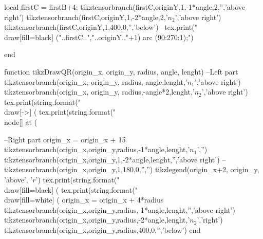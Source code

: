 \begin{luacode*}
	 local firstC = firstB+4;
	 tikztensorbranch(firstC,originY,1,-1*angle,2,'','above right')
	 tikztensorbranch(firstC,originY,1,-2*angle,2,'$n_{2}$','above right')
	 tikztensorbranch(firstC,originY,1,400,0,'','below')
	 --tex.print("\\draw[fill=black] ("..firstC..","..originY.."+1) arc (90:270:1);")

end

function tikzDrawQR(origin_x, origin_y, radius, angle, lenght)
	 --Left part
	 tikztensorbranch(origin_x, origin_y, radius,-angle,lenght,'$n_{1}$','above right')
	 tikztensorbranch(origin_x, origin_y, radius,-angle*2,lenght,'$n_{2}$','above right')
	 tex.print(string.format("\\draw[->] (%
	 tex.print(string.format("\\node[] at (%
	 
	 --Right part
	 origin_x = origin_x + 15
	 tikztensorbranch(origin_x,origin_y,radius,-1*angle,lenght,'$n_{1}$','')
	 tikztensorbranch(origin_x,origin_y,1,-2*angle,lenght,'','above right')
	 --tikztensorbranch(origin_x,origin_y,1,180,0,'','')
	 tikzlegend(origin_x+2, origin_y, 'above', '$r$')
	 tex.print(string.format("\\draw[fill=black] (%
	 tex.print(string.format("\\draw[fill=white] (%
	 origin_x = origin_x + 4*radius
	 tikztensorbranch(origin_x,origin_y,radius,-1*angle,lenght,'','above right')
	 tikztensorbranch(origin_x,origin_y,radius,-2*angle,lenght,'$n_{2}$','right')
	 tikztensorbranch(origin_x,origin_y,radius,400,0,'','below')
end



\end{luacode*}
